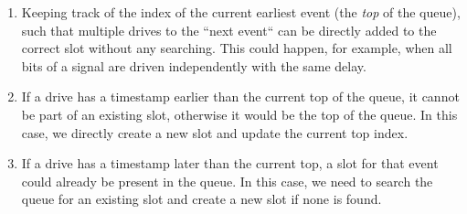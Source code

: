 \begin{enumerate}
        \begin{enumerate}
          \item Keeping track of the index of the current earliest event (the \textit{top} of the queue), such that multiple drives to the “next event“ can be directly added to the correct slot without any searching. This could happen, for example, when all bits of a signal are driven independently with the same delay.
          \item If a drive has a timestamp earlier than the current top of the queue, it cannot be part of an existing slot, otherwise it would be the top of the queue. In this case, we directly create a new slot and update the current top index.
          \item If a drive has a timestamp later than the current top, a slot for that event could already be present in the queue. In this case, we need to search the queue for an existing slot and create a new slot if none is found.
        \end{enumerate}
\end{enumerate}


